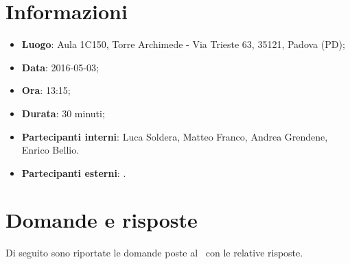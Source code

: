 \documentclass[a4paper,titlepage]{article}
\begin{document}
\maketitle

\begin{diario}
\end{diario}

\newpage
\tableofcontents

\newpage
\section{Informazioni}
\label{sec:Informazioni}

\begin{itemize}
 \item \textbf{Luogo}: Aula 1C150, Torre Archimede - Via Trieste 63, 35121, Padova (PD);
 \item \textbf{Data}: 2016-05-03;
 \item \textbf{Ora}: 13:15;
 \item \textbf{Durata}: 30 minuti;
 \item \textbf{Partecipanti interni}: Luca Soldera, Matteo Franco, Andrea Grendene, Enrico Bellio.
 \item \textbf{Partecipanti esterni}: \CARDIN.
\end{itemize}

\section{Domande e risposte}
\label{sec:Domande e risposte}
Di seguito sono riportate le domande poste al \CARDIN\ con le relative risposte.
\end{document}
